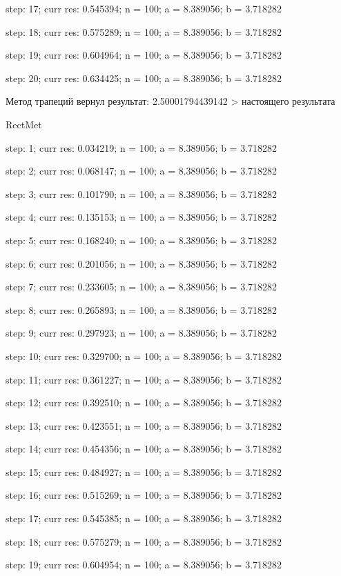 \documentclass[14pt]{extreport}
\begin{document}
step: 17; curr res: 0.545394; n = 100; a = 8.389056; b = 3.718282

step: 18; curr res: 0.575289; n = 100; a = 8.389056; b = 3.718282

step: 19; curr res: 0.604964; n = 100; a = 8.389056; b = 3.718282

step: 20; curr res: 0.634425; n = 100; a = 8.389056; b = 3.718282

Метод трапеций вернул результат: 2.50001794439142 > настоящего результата

RectMet

step: 1; curr res: 0.034219; n = 100; a = 8.389056; b = 3.718282

step: 2; curr res: 0.068147; n = 100; a = 8.389056; b = 3.718282

step: 3; curr res: 0.101790; n = 100; a = 8.389056; b = 3.718282

step: 4; curr res: 0.135153; n = 100; a = 8.389056; b = 3.718282

step: 5; curr res: 0.168240; n = 100; a = 8.389056; b = 3.718282

step: 6; curr res: 0.201056; n = 100; a = 8.389056; b = 3.718282

step: 7; curr res: 0.233605; n = 100; a = 8.389056; b = 3.718282

step: 8; curr res: 0.265893; n = 100; a = 8.389056; b = 3.718282

step: 9; curr res: 0.297923; n = 100; a = 8.389056; b = 3.718282

step: 10; curr res: 0.329700; n = 100; a = 8.389056; b = 3.718282

step: 11; curr res: 0.361227; n = 100; a = 8.389056; b = 3.718282

step: 12; curr res: 0.392510; n = 100; a = 8.389056; b = 3.718282

step: 13; curr res: 0.423551; n = 100; a = 8.389056; b = 3.718282

step: 14; curr res: 0.454356; n = 100; a = 8.389056; b = 3.718282

step: 15; curr res: 0.484927; n = 100; a = 8.389056; b = 3.718282

step: 16; curr res: 0.515269; n = 100; a = 8.389056; b = 3.718282

step: 17; curr res: 0.545385; n = 100; a = 8.389056; b = 3.718282

step: 18; curr res: 0.575279; n = 100; a = 8.389056; b = 3.718282

step: 19; curr res: 0.604954; n = 100; a = 8.389056; b = 3.718282
\end{document}
